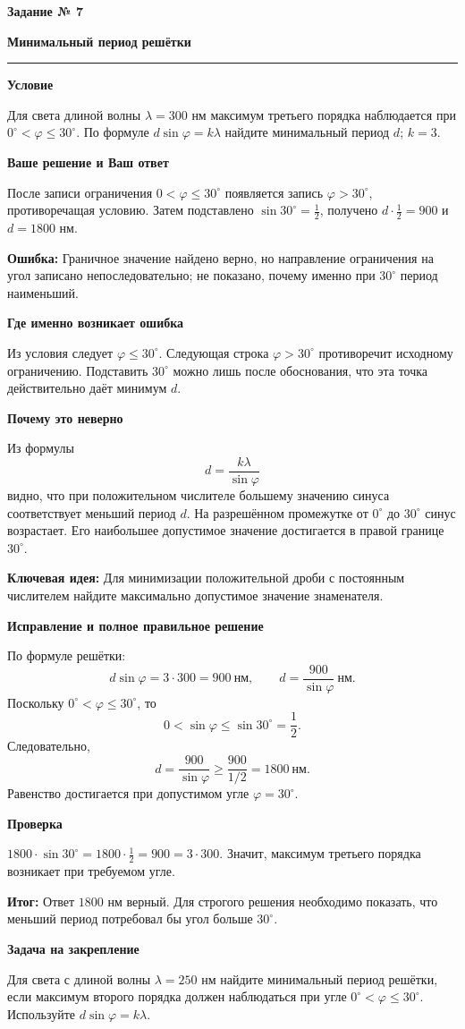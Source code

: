 \documentclass[a4paper,11pt]{article}
\newcommand{\taskheading}[2]{%
  \phantomsection\label{task:#1}%
  {\color{accent}\large\bfseries Задание № #1}\par\vspace{2mm}%
  {\LARGE\bfseries\color{ink}#2}\par\vspace{3mm}\noindent\color{accent}\rule{\linewidth}{0.5pt}\color{black}\par}
\newcommand{\field}[1]{\par\textbf{#1}\par\nobreak}
\newcommand{\idea}{\textcolor{blue!60!black}{\textbf{Ключевая идея:}}}
\newcommand{\mistake}{\textcolor{red!75!black}{\textbf{Ошибка:}}}
\newcommand{\outcome}{\textcolor{teal!60!black}{\textbf{Итог:}}}
\begin{document}
\taskheading{7}{Минимальный период решётки}
\field{Условие}
Для света длиной волны $\lambda=300$ нм максимум третьего порядка наблюдается при $0^\circ<\varphi\le30^\circ$. По формуле $d\sin\varphi=k\lambda$ найдите минимальный период $d$; $k=3$.

\field{Ваше решение и Ваш ответ}
После записи ограничения $0<\varphi\le30^\circ$ появляется запись $\varphi>30^\circ$, противоречащая условию. Затем подставлено $\sin30^\circ=\frac12$, получено $d\cdot\frac12=900$ и $d=1800$ нм.

\mistake\; Граничное значение найдено верно, но направление ограничения на угол записано непоследовательно; не показано, почему именно при $30^\circ$ период наименьший.

\field{Где именно возникает ошибка}
Из условия следует $\varphi\le30^\circ$. Следующая строка $\varphi>30^\circ$ противоречит исходному ограничению. Подставить $30^\circ$ можно лишь после обоснования, что эта точка действительно даёт минимум $d$.

\field{Почему это неверно}
Из формулы
\[
d=\frac{k\lambda}{\sin\varphi}
\]
видно, что при положительном числителе большему значению синуса соответствует меньший период $d$. На разрешённом промежутке от $0^\circ$ до $30^\circ$ синус возрастает. Его наибольшее допустимое значение достигается в правой границе $30^\circ$.

\idea\; Для минимизации положительной дроби с постоянным числителем найдите максимально допустимое значение знаменателя.

\field{Исправление и полное правильное решение}
По формуле решётки:
\[
d\sin\varphi=3\cdot300=900\ \text{нм},
\qquad d=\frac{900}{\sin\varphi}\ \text{нм}.
\]
Поскольку $0^\circ<\varphi\le30^\circ$, то
\[
0<\sin\varphi\le\sin30^\circ=\frac12.
\]
Следовательно,
\[
d=\frac{900}{\sin\varphi}\ge\frac{900}{1/2}=1800\ \text{нм}.
\]
Равенство достигается при допустимом угле $\varphi=30^\circ$.

\field{Проверка}
$1800\cdot\sin30^\circ=1800\cdot\frac12=900=3\cdot300$. Значит, максимум третьего порядка возникает при требуемом угле.

\outcome\; Ответ $1800$ нм верный. Для строгого решения необходимо показать, что меньший период потребовал бы угол больше $30^\circ$.

\field{Задача на закрепление}
Для света с длиной волны $\lambda=250$ нм найдите минимальный период решётки, если максимум второго порядка должен наблюдаться при угле $0^\circ<\varphi\le30^\circ$. Используйте $d\sin\varphi=k\lambda$.
\clearpage
\end{document}
